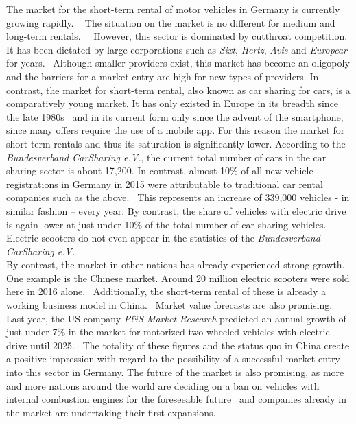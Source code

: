 \documentclass[12pt,a4paper]{report}
\begin{document}
The market for the short-term rental of motor vehicles in Germany is currently growing rapidly.
~\cite{bundesverband-carsharing-statistics}
The situation on the market is no different for medium and long-term rentals.
~\cite{sparkasse-kfz-vermietung}~However, this sector is dominated by cutthroat competition.
It has been dictated by large corporations such as \textit{Sixt}, \textit{Hertz},
\textit{Avis} and \textit{Europcar} for years.~\cite{sparkasse-kfz-vermietung}
Although smaller providers exist, this market has become an oligopoly and
the barriers for a market entry are high for new types of providers.
In contrast, the market for short-term rental, also known as car sharing for cars,
is a comparatively young market. It has only existed in Europe in its breadth
since the late 1980s~\cite{history-of-carsharing} and in its current form
only since the advent of the smartphone, since many offers require the use of a mobile app.
For this reason the market for short-term rentals and thus its saturation is significantly lower.
According to the \textit{Bundesverband CarSharing e.V.}, the current total number of cars
in the car sharing sector is about 17,200. In contrast, almost 10\% of all
new vehicle registrations in Germany in 2015 were attributable to traditional
car rental companies such as the above.~\cite{sparkasse-kfz-vermietung}
This represents an increase of 339,000 vehicles - in similar fashion – every year.
By contrast, the share of vehicles with electric drive is again lower at
just under 10\% of the total number of car sharing vehicles.
Electric scooters do not even appear in the statistics of the
\textit{Bundesverband CarSharing e.V.}~\cite{bundesverband-carsharing-statistics}\\
By contrast, the market in other nations has already experienced strong growth.
One example is the Chinese market. Around 20 million electric scooters were sold
here in 2016 alone.~\cite{heise-electric-scooters}
Additionally, the short-term rental of these is already a working business model
in China.~\cite{allchinatech-electric-scooters} Market value forecasts are also promising.
Last year, the US company \textit{P\&S Market Research} predicted an annual growth of
just under 7\% in the market for motorized two-wheeled vehicles with
electric drive until 2025.~\cite{pands-electric-scooters}
The totality of these figures and the status quo in China create a positive impression
with regard to the possibility of a successful market entry into this sector in Germany.
The future of the market is also promising, as more and more nations around the world
are deciding on a ban on vehicles with internal combustion engines for the
foreseeable future~\cite{faz-combustion-engine-ban} and companies already
in the market are undertaking their first expansions.
~\cite{allchinatech-electric-scooters, faz-electric-scooters}
\end{document}
